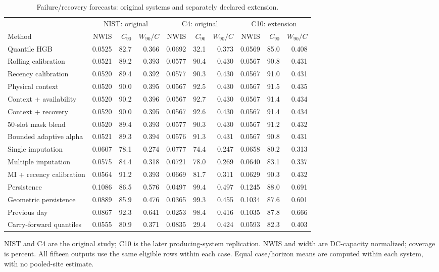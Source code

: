 \begin{table}[t]
\centering\footnotesize
\caption{Failure/recovery forecasts: original systems and separately declared extension.}
\label{tab:main}
\setlength{\tabcolsep}{2.5pt}
\begin{tabular}{lrrrrrrrrr}
\hline
 & \multicolumn{3}{c}{NIST: original} & \multicolumn{3}{c}{C4: original} & \multicolumn{3}{c}{C10: extension} \\
Method & NWIS & $C_{90}$ & $W_{90}/C$ & NWIS & $C_{90}$ & $W_{90}/C$ & NWIS & $C_{90}$ & $W_{90}/C$ \\
\hline
Quantile HGB & 0.0525 & 82.7 & 0.366 & 0.0692 & 32.1 & 0.373 & 0.0569 & 85.0 & 0.408 \\
Rolling calibration & 0.0521 & 89.2 & 0.393 & 0.0577 & 90.4 & 0.430 & 0.0567 & 90.8 & 0.431 \\
Recency calibration & 0.0520 & 89.4 & 0.392 & 0.0577 & 90.3 & 0.430 & 0.0567 & 91.0 & 0.431 \\
Physical context & 0.0520 & 90.0 & 0.395 & 0.0567 & 92.5 & 0.430 & 0.0567 & 91.5 & 0.435 \\
Context + availability & 0.0520 & 90.2 & 0.396 & 0.0567 & 92.7 & 0.430 & 0.0567 & 91.4 & 0.434 \\
Context + recovery & 0.0520 & 90.0 & 0.395 & 0.0567 & 92.6 & 0.430 & 0.0567 & 91.4 & 0.434 \\
50-slot mask blend & 0.0520 & 89.4 & 0.393 & 0.0577 & 90.3 & 0.430 & 0.0567 & 91.2 & 0.432 \\
Bounded adaptive alpha & 0.0521 & 89.3 & 0.394 & 0.0576 & 91.3 & 0.431 & 0.0567 & 90.8 & 0.431 \\
Single imputation & 0.0607 & 78.1 & 0.274 & 0.0777 & 74.4 & 0.247 & 0.0658 & 80.2 & 0.313 \\
Multiple imputation & 0.0575 & 84.4 & 0.318 & 0.0721 & 78.0 & 0.269 & 0.0640 & 83.1 & 0.337 \\
MI + recency calibration & 0.0564 & 91.2 & 0.393 & 0.0669 & 81.7 & 0.311 & 0.0629 & 90.3 & 0.432 \\
Persistence & 0.1086 & 86.5 & 0.576 & 0.0497 & 99.4 & 0.497 & 0.1245 & 88.0 & 0.691 \\
Geometric persistence & 0.0889 & 85.9 & 0.476 & 0.0365 & 99.3 & 0.455 & 0.1034 & 87.6 & 0.601 \\
Previous day & 0.0867 & 92.3 & 0.641 & 0.0253 & 98.4 & 0.416 & 0.1035 & 87.8 & 0.666 \\
Carry-forward quantiles & 0.0555 & 80.9 & 0.371 & 0.0835 & 29.4 & 0.424 & 0.0593 & 82.3 & 0.403 \\
\hline
\end{tabular}
\par\smallskip
\begin{minipage}{\textwidth}\scriptsize
NIST and C4 are the original study; C10 is the later producing-system replication. NWIS and width are DC-capacity normalized; coverage is percent. All fifteen outputs use the same eligible rows within each case. Equal case/horizon means are computed within each system, with no pooled-site estimate.
\end{minipage}
\end{table}

